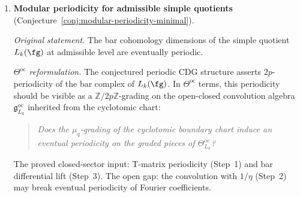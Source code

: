 \begin{enumerate}[resume, label=\textup{(\arabic*)}]
 \smallskip\noindent
 \emph{$\Theta^{\mathrm{oc}}$ reformulation.}
 The local-global bridge
 (Theorem~\ref{thm:thqg-local-global-bridge}) identifies the
 formal-disk restriction of the bordered FM convolution with
 $C^\bullet_{\mathrm{ch}}(\cA, \cA)$. The global extension
 asks for a sheaf of open-closed convolution algebras
 $\mathfrak{g}^{\mathrm{oc}}_{X, D, \tau}$
 on $(X, D, \tau)$ with a global MC element
 $\Theta^{\mathrm{oc}, \mathrm{glob}}_\cA$ whose stalk at
 each formal disk reproduces the local $\Theta^{\mathrm{oc}}_\cA$.
 In $\Theta^{\mathrm{oc}}$ terms:
 \begin{quote}
 \emph{Does $\Theta^{\mathrm{oc}}_\cA$ glue to a global
 section of the sheaf of open-closed MC moduli on $(X, D, \tau)$,
 satisfying excision and descent for the open factorization
 category?}
 \end{quote}
 The local data are proved. The globalisation requires
 constructing the excision sequence for the bordered FM
 compactification on curves with real-blowup boundary data.

\item \textbf{Modular periodicity for admissible simple quotients}
 (Conjecture~\ref{conj:modular-periodicity-minimal}).

 \smallskip\noindent
 \emph{Original statement.}
 The bar cohomology dimensions of the simple quotient $L_k(\fg)$
 at admissible level are eventually periodic.

 \smallskip\noindent
 \emph{$\Theta^{\mathrm{oc}}$ reformulation.}
 The conjectured periodic CDG structure
 asserts $2p$-periodicity of
 the bar complex of $L_k(\fg)$. In
 $\Theta^{\mathrm{oc}}$ terms, this periodicity should be
 visible as a $\mathbb{Z}/2p\mathbb{Z}$-grading on the
 open-closed convolution algebra
 $\mathfrak{g}^{\mathrm{oc}}_{L_k}$ inherited from the
 cyclotomic chart:
 \begin{quote}
 \emph{Does the $\mu_q$-grading of the cyclotomic boundary chart
 induce an eventual periodicity on the graded pieces of
 $\Theta^{\mathrm{oc}}_{L_k}$?}
 \end{quote}
 The proved closed-sector input: T-matrix periodicity (Step~1)
 and bar differential lift (Step~3). The open gap: the
 convolution with $1/\eta$ (Step~2) may break eventual
 periodicity of Fourier coefficients.

\end{enumerate}

